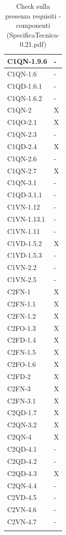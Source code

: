\begin{footnotesize}
\begin{longtable}{|p{}|p{}|}
 C1QN-1.9.6 &-  \\ \hline
 C1QN-1.6 &- \\ \hline
 C1QD-1.6.1&- \\ \hline
 C1QN-1.6.2&-   \\ \hline
 C1QN-2&X \\ \hline
 C1QO-2.1&X \\ \hline
 C1QN-2.3&-  \\ \hline
 C1QD-2.4&X  \\ \hline
 C1QN-2.6&-  \\ \hline
 C1QN-2.7&X    \\ \hline
 C1QN-3.1&-   \\ \hline
 C1QD-3.1.1&-    \\ \hline
 C1VN-1.12&- \\ \hline
 C1VN-1.13.1&-  \\ \hline
 C1VN-1.11&-  \\ \hline
 C1VD-1.5.2&X \\ \hline
 C1VD-1.5.3&-   \\ \hline
 C1VN-2.2&- \\ \hline
 C1VN-2.5&-  \\ \hline
 C2FN-1&X    \\ \hline
 C2FN-1.1&X    \\ \hline
 C2FN-1.2&X   \\ \hline
 C2FO-1.3&X    \\ \hline
 C2FD-1.4&X   \\ \hline
 C2FN-1.5&X   \\ \hline
 C2FO-1.6&X   \\ \hline
 C2FD-2&X    \\ \hline
 C2FN-3&X   \\ \hline
 C2FN-3.1&X   \\ \hline
 C2QD-1.7&X   \\ \hline
 C2QN-3.2&X   \\ \hline
 C2QN-4 &X  \\ \hline
 C2QD-4.1&-    \\ \hline
 C2QD-4.2&-   \\ \hline
 C2QD-4.3&X   \\ \hline
 C2QN-4.4&-  \\ \hline
 C2VD-4.5&-   \\ \hline
 C2VN-4.6&-    \\ \hline
 C2VN-4.7&-  \\ \hline

\caption{Check sulla presenza requisiti - componenti
(SpecificaTecnica-0.21.pdf)}
\end{longtable}
\end{footnotesize}

